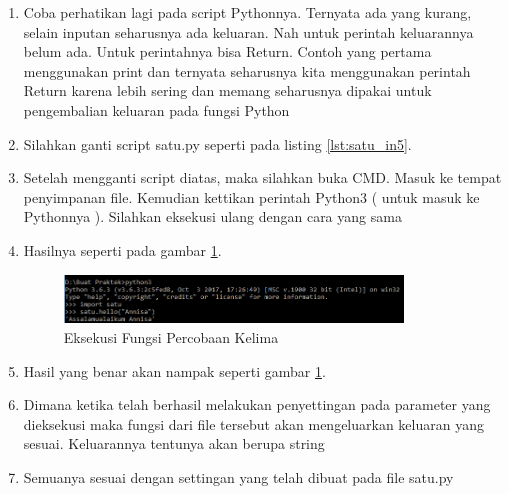 \begin{enumerate}
\item Coba perhatikan lagi pada script Pythonnya. Ternyata ada yang kurang, selain inputan seharusnya ada keluaran. Nah untuk perintah keluarannya belum ada. Untuk perintahnya bisa Return. Contoh yang pertama menggunakan print dan ternyata seharusnya kita menggunakan perintah Return karena lebih sering dan memang seharusnya dipakai untuk pengembalian keluaran pada fungsi Python
\item Silahkan ganti script satu.py seperti pada listing \ref{lst:satu_in5}.

\item Setelah mengganti script diatas, maka silahkan buka CMD. Masuk ke tempat penyimpanan file. Kemudian kettikan perintah Python3 ( untuk masuk ke Pythonnya ). Silahkan eksekusi ulang dengan cara yang sama
\item Hasilnya seperti pada gambar \ref{fig:eksekusi_fungsi5}.
\begin{figure}[!htbp]
	\centerline{\includegraphics[width=0.85\textwidth]{figures/8/eksekusi_fungsi5.png}}
	\caption{Eksekusi Fungsi Percobaan Kelima}
	\label{fig:eksekusi_fungsi5}
\end{figure}
\item Hasil yang benar akan nampak seperti gambar \ref{fig:eksekusi_fungsi5}.
\item Dimana ketika telah berhasil melakukan penyettingan pada parameter yang dieksekusi maka fungsi dari file tersebut akan mengeluarkan keluaran yang sesuai. Keluarannya tentunya akan berupa string
\item Semuanya sesuai dengan settingan yang telah dibuat pada file satu.py
\end{enumerate}

